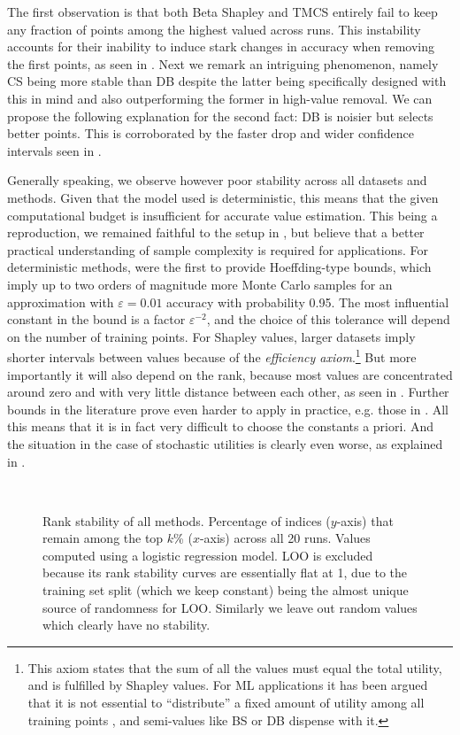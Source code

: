 \documentclass[10pt]{article}
\newcommand{\tmem}[1]{{\em #1\/}}
\begin{document}
The first observation is that both Beta Shapley and TMCS entirely fail to keep
any fraction of points among the highest valued across runs. This instability
accounts for their inability to induce stark changes in accuracy when removing
the first points, as seen in . Next we remark an
intriguing phenomenon, namely CS being more stable than DB despite the latter
being specifically designed with this in mind and also outperforming the
former in high-value removal. We can propose the following explanation for the
second fact: DB is noisier but selects better points. This is corroborated by
the faster drop and wider confidence intervals seen in .

Generally speaking, we observe however poor stability across all datasets and
methods. Given that the model used is deterministic, this means that the given
computational budget is insufficient for accurate value estimation. This being
a reproduction, we remained faithful to the setup in
{\cite{schoch_csshapley_2022}}, but believe that a better practical
understanding of sample complexity is required for applications. For
deterministic methods, {\cite{maleki_bounding_2014}} were the first to
provide Hoeffding-type bounds, which imply up to two orders of magnitude more
Monte Carlo samples for an approximation with $\varepsilon = 0.01$ accuracy
with probability 0.95. The most influential constant in the bound is a factor
$\varepsilon^{- 2}$, and the choice of this tolerance will depend on the
number of training points. For Shapley values, larger datasets imply shorter
intervals between values because of the {\tmem{efficiency
axiom}}.\footnote{This axiom states that the sum of all the values must equal
the total utility, and is fulfilled by Shapley values. For ML applications it
has been argued that it is not essential to ``distribute'' a fixed amount of
utility among all training points {\cite{kwon_beta_2022}}, and semi-values
like BS or DB dispense with it.} But more importantly it will also depend on
the rank, because most values are concentrated around zero and with very
little distance between each other, as seen in . Further
bounds in the literature prove even harder to apply in practice, e.g. those in
{\cite{watson_accelerated_2023}}. All this means that it is in fact very
difficult to choose the constants a priori. And the situation in the case of
stochastic utilities is clearly even worse, as explained in
{\cite{wang_data_2022}}.

\begin{figure}[h]
   \
  \caption{\label{fig:rank-stability}Rank stability of all methods.
  Percentage of indices ($y$-axis) that remain among the top $k$\% ($x$-axis)
  across all 20 runs. Values computed using a logistic regression model. LOO
  is excluded because its rank stability curves are essentially flat at 1, due
  to the training set split (which we keep constant) being the almost unique
  source of randomness for LOO. Similarly we leave out random values which
  clearly have no stability.}
\end{figure}
\end{document}
